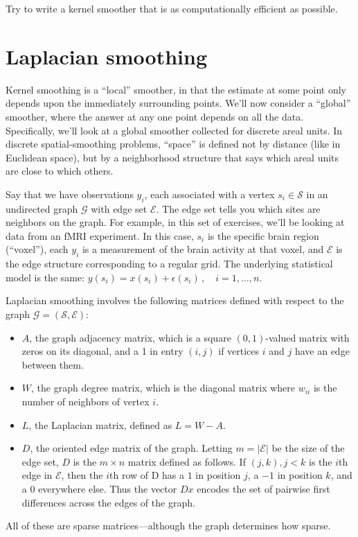 \documentclass{mynotes}
\begin{document}
Try to write a kernel smoother that is as computationally efficient as possible.


\section{Laplacian smoothing}

Kernel smoothing is a ``local'' smoother, in that the estimate at some point only depends upon the immediately surrounding points.  We'll now consider a ``global'' smoother, where the answer at any one point depends on all the data.  Specifically, we'll look at a global smoother collected for discrete areal units.  In discrete spatial-smoothing problems, ``space'' is defined not by distance (like in Euclidean space), but by a neighborhood structure that says which areal units are close to which others.

Say that we have observations $y_i$, each associated with a vertex $s_i \in \mathcal{S}$ in an undirected graph $\mathcal{G}$ with edge set $\mathcal{E}$.  The edge set tells you which sites are neighbors on the graph.  For example, in this set of exercises, we'll be looking at data from an fMRI experiment.  In this case, $s_i$ is the specific brain region (``voxel''), each $y_i$ is a measurement of the brain activity at that voxel, and $\mathcal{E}$ is the edge structure corresponding to a regular grid.  The underlying statistical model is the same: $y(s_i) = x(s_i) + \epsilon(s_i) \, , \quad i = 1, \ldots, n$.


Laplacian smoothing involves the following matrices defined with respect to the graph $\mathcal{G} = (\mathcal{S}, \mathcal{E})$:
\begin{itemize}
\item $A$, the graph adjacency matrix, which is a square $(0,1)$-valued matrix with zeros on its diagonal, and a 1 in entry $(i,j)$ if vertices $i$ and $j$ have an edge between them.
\item $W$, the graph degree matrix, which is the diagonal matrix where $w_{ii}$ is the number of neighbors of vertex $i$.
\item $L$, the Laplacian matrix, defined as $L = W - A$.
\item $D$, the oriented edge matrix of the graph.   Letting $m = |\mathcal{E}|$ be the size of the edge set, $D$ is the $m \times n$ matrix defined as follows.  If $(j,k), j<k$ is the $i$th edge in $\mathcal{E}$, then the $i$th row of D has a $1$ in position $j$, a $-1$ in position $k$, and a $0$ everywhere else.  Thus the vector $D x$ encodes the set of pairwise first differences across the edges of the graph.
\end{itemize}
All of these are sparse matrices---although the graph determines how sparse.
\end{document}
